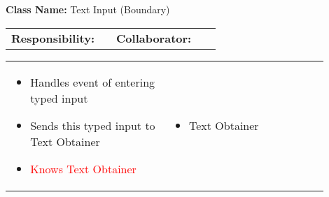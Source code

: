 \begin{cards}[]
    \textbf{Class Name:} Text Input (Boundary)
    \tcbline
    \begin{tabular}{p{0.45\linewidth} | p{0.45\linewidth}}
        \textbf{Responsibility:}& 
        \textbf{Collaborator:}\\
    \end{tabular}
    \tcbline
    \begin{tabular}{p{0.45\linewidth} | p{0.45\linewidth}}
        \begin{itemize}
            \item Handles event of entering typed input
            \item Sends this typed input to Text Obtainer
            \item \textcolor{red}{Knows Text Obtainer}
        \end{itemize}
        &
        \begin{itemize}
            \item Text Obtainer
        \end{itemize}
    \end{tabular}
\end{cards}